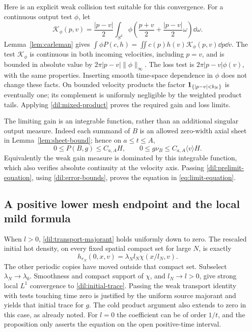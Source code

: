 Here is an explicit weak collision test suitable for this convergence.
For a continuous output test \(\phi\), let
\[
\mathcal K_\phi(p,v)
=\frac{|p-v|}{2}\int_{S^2}
 \phi\left(\frac{p+v}{2}+\frac{|p-v|}{2}\omega\right)\dd\omega.
\]
Lemma~\ref{lem:carleman} gives
\(\int\phi P(c,h)=\iint c(p)h(v)\mathcal K_\phi(p,v)\dd p\dd v\).
The test \(\mathcal K_\phi\) is continuous in both incoming
velocities, including \(p=v\), and is bounded in absolute value by
\(2\pi|p-v|\|\phi\|_\infty\). The loss test is
\(2\pi|p-v|\phi(v)\), with the same properties. Inserting smooth
time-space dependence in \(\phi\) does not change these facts.
On bounded velocity products the factor
\(\mathbf 1_{\{|p-v|<b_N\}}\) is eventually one; its complement is
uniformly negligible by the weighted product tails. Applying
\eqref{dil:mixed-product} proves the required gain and loss limits.

The limiting gain is an integrable function, rather than an additional
singular output measure. Indeed each summand of \(B\) is an allowed
zero-width axial sheet in Lemma~\ref{lem:sheet-bound}; hence on
\(a\leq t\leq A\),
\[
0\leq P(B,g)\leq C_{a,A}H,
\qquad 0\leq g\nu_B\leq C_{a,A}\langle v\rangle H.
\]
Equivalently the weak gain measure is dominated by this integrable
function, which also verifies absolute continuity at the velocity
axis. Passing \eqref{dil:prelimit-equation}, using
\eqref{dil:error-bounds}, proves the equation in
\eqref{eq:limit-equation}.

\subsection{A positive lower mesh endpoint and the local mild formula}

When \(l>0\), \eqref{dil:transport-majorant} holds uniformly down to
zero. The rescaled initial hot density, on every fixed spatial compact
set for large \(N\), is exactly
\[
h_{r_N}(0,x,v)=\lambda_N l_N\chi(x/l_N,v).
\]
The other periodic copies have moved outside that compact set.
Subselect \(\lambda_N\to\lambda_0\). Smoothness and compact support
of \(\chi\), and \(l_N\to l>0\), give strong local \(L^1\)
convergence to \eqref{dil:initial-trace}. Passing the weak transport
identity with tests touching time zero is justified by the uniform
source majorant and yields that initial trace for \(g\). The cold
product argument also extends to zero in this case, as already noted.
For \(l=0\) the coefficient can be of order \(1/t\), and the
proposition only asserts the equation on the open positive-time
interval.

